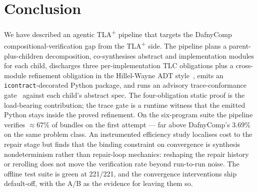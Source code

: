 \documentclass[11pt]{article}
\newcommand{\TLA}{TLA\textsuperscript{+}}
\begin{document}
\section{Conclusion}\label{sec:concl}

We have described an agentic \TLA{} pipeline that targets the
DafnyComp~\cite{dafnycomp2025} compositional-verification gap from the
\TLA{} side. The pipeline plans a parent-plus-children decomposition,
co-synthesises abstract and implementation modules for each child,
discharges three per-implementation TLC obligations plus a cross-module
refinement obligation in the Hillel-Wayne ADT style~\cite{hillelwayne-tla-adt},
emits an \texttt{icontract}-decorated Python package, and runs an advisory
trace-conformance gate~\cite{cirstea2024} against each child's abstract
spec. The four-obligation static proof is the load-bearing contribution;
the trace gate is a runtime witness that the emitted Python stays inside
the proved refinement. On the six-program suite the pipeline verifies
$\approx 67\%$ of bundles on the first attempt --- far above DafnyComp's
$3.69\%$ on the same problem class. An instrumented efficiency study localises
cost to the repair stage but finds that the binding constraint on convergence is
synthesis nondeterminism rather than repair-loop mechanics: reshaping the repair
history or rerolling does not move the verification rate beyond run-to-run noise.
The offline test suite is green at 221/221, and the convergence interventions ship
default-off, with the A/B as the evidence for leaving them so.



\end{document}
